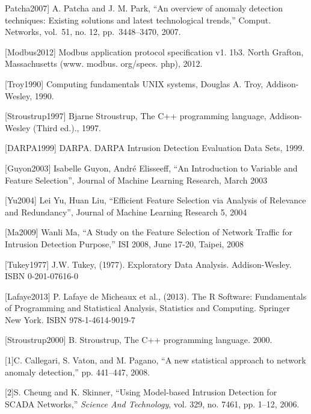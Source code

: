 \documentclass[12pt,]{article}
\begin{document}
Patcha2007{]} A. Patcha and J. M. Park, ``An overview of anomaly
detection techniques: Existing solutions and latest technological
trends,'' Comput. Networks, vol.~51, no. 12, pp.~3448--3470, 2007.

{[}Modbus2012{]} Modbus application protocol specification v1. 1b3.
North Grafton, Massachusetts (www. modbus. org/specs. php), 2012.

{[}Troy1990{]} Computing fundamentals UNIX systems, Douglas A. Troy,
Addison-Wesley, 1990.

{[}Stroustrup1997{]} Bjarne Stroustrup, The C++ programming language,
Addison-Wesley (Third ed.)., 1997.

{[}DARPA1999{]} DARPA. DARPA Intrusion Detection Evaluation Data Sets,
1999.

{[}Guyon2003{]} Isabelle Guyon, André Elisseeff, ``An Introduction to
Variable and Feature Selection'', Journal of Machine Learning Research,
March 2003

{[}Yu2004{]} Lei Yu, Huan Liu, ``Efficient Feature Selection via
Analysis of Relevance and Redundancy'', Journal of Machine Learning
Research 5, 2004

{[}Ma2009{]} Wanli Ma, ``A Study on the Feature Selection of Network
Traffic for Intrusion Detection Purpose,'' ISI 2008, June 17-20, Taipei,
2008

{[}Tukey1977{]} J.W. Tukey, (1977). Exploratory Data Analysis.
Addison-Wesley. ISBN 0-201-07616-0

{[}Lafaye2013{]} P. Lafaye de Micheaux et al., (2013). The R Software:
Fundamentals of Programming and Statistical Analysis, Statistics and
Computing. Springer New York. ISBN 978-1-4614-9019-7

{[}Stroustrup2000{]} B. Stroustrup, The C++ programming language. 2000.

\pagebreak

{[}1{]}C. Callegari, S. Vaton, and M. Pagano, ``A new statistical
approach to network anomaly detection,'' pp. 441--447, 2008.

{[}2{]}S. Cheung and K. Skinner, ``Using Model-based Intrusion Detection
for SCADA Networks,'' \emph{Science And Technology}, vol. 329, no. 7461,
pp. 1--12, 2006.
\end{document}
